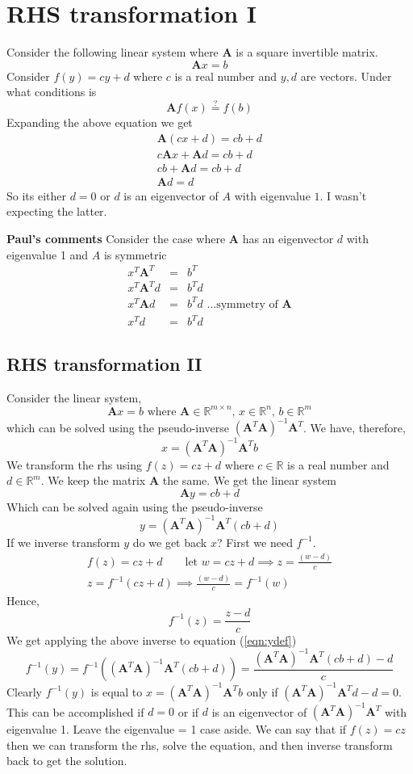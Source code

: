 \documentclass{article}
\newcommand{\beq}{\begin{equation}}
\newcommand{\eeq}{\end{equation}}
\newcommand{\ber}{\begin{eqnarray}}
\newcommand{\eer}{\end{eqnarray}}
\begin{document}
\section{RHS transformation I}
Consider the following linear system where $\pmb{A}$ is a square invertible matrix.
\beq
\pmb{A}x = b
\eeq
Consider $f(y) = cy + d$ where $c$ is a real number and  $y,d$ are vectors. Under what conditions is
\beq
\pmb{A}f(x) \stackrel{?}{=} f(b)
\eeq
Expanding the above equation we get
\ber
\pmb{A}(cx+d) = cb+d\\
c\pmb{A}x + \pmb{A}d = cb + d\\
cb + \pmb{A}d= cb + d\\
\pmb{A}d = d
\eer
So its either $d=0$ or $d$ is an eigenvector of $A$ with eigenvalue $1$. I wasn't expecting the latter.

\textbf{Paul's comments}
Consider the case where $\pmb{A}$ has an eigenvector $d$ with eigenvalue 1 and $A$ is symmetric
\ber
x^T\pmb{A}^T &=& b^T \\
x^T\pmb{A}^Td &=& b^Td  \\
x^T\pmb{A}d &=& b^Td  \text{ ...symmetry of } \pmb{A}\\
x^Td &=& b^Td
\eer




\subsection{RHS transformation II }
Consider the linear system,
\beq
\pmb{A}x = b \text{ where } \pmb{A}\in\mathbb{R}^{m\times{n}},\,x\in\mathbb{R}^n,\,b\in\mathbb{R}^m
\eeq
which can be solved using the pseudo-inverse $(\pmb{A}^{T}\pmb{A})^{-1}\pmb{A}^T$. We have, therefore,
\beq
x = (\pmb{A}^{T}\pmb{A})^{-1}\pmb{A}^Tb
\eeq
We transform the rhs using $f(z)=cz+d$ where $c\in\mathbb{R}$ is a real number and $d\in\mathbb{R}^{m}$. We keep the matrix $\pmb{A}$ the same. We get the linear system
\beq
\pmb{A}y = cb + d 
\eeq
Which can be solved again using the pseudo-inverse
\beq
\label{eqn:ydef}
y = (\pmb{A}^{T}\pmb{A})^{-1}\pmb{A}^T(cb + d)
\eeq
If we inverse transform $y$ do we get back $x$? First we need $f^{-1}$.
\ber
f(z)=cz+d \qquad \text{let } w = cz+d \implies z =\frac{(w-d)}{c}\\
z = f^{-1}(cz+d) \implies  \frac{(w-d)}{c} = f^{-1}(w)
\eer
Hence,
\beq
f^{-1}(z) = \frac{z-d}{c}
\eeq
We get applying the above inverse to equation (\ref{eqn:ydef})
\beq
f^{-1}(y) = f^{-1}((\pmb{A}^{T}\pmb{A})^{-1}\pmb{A}^T(cb + d)) = \frac{(\pmb{A}^{T}\pmb{A})^{-1}\pmb{A}^T(cb + d) -d}{c}
\eeq
Clearly $f^{-1}(y)$ is equal to $x=(\pmb{A}^{T}\pmb{A})^{-1}\pmb{A}^Tb$ only if $(\pmb{A}^{T}\pmb{A})^{-1}\pmb{A}^Td-d = 0$. This can be accomplished if $d=0$ or if $d$ is an eigenvector of $(\pmb{A}^{T}\pmb{A})^{-1}\pmb{A}^T$ with eigenvalue 1. Leave the eigenvalue = 1 case  aside. We can say that if $f(z)=cz$ then we can transform the rhs, solve the equation, and then inverse transform back to get the solution.
\end{document}
